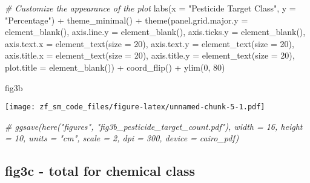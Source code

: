 \documentclass[
]{article}
\newenvironment{Shaded}{\begin{snugshade}}{\end{snugshade}}
\newcommand{\AttributeTok}[1]{\textcolor[rgb]{0.77,0.63,0.00}{#1}}
\newcommand{\CommentTok}[1]{\textcolor[rgb]{0.56,0.35,0.01}{\textit{#1}}}
\newcommand{\DecValTok}[1]{\textcolor[rgb]{0.00,0.00,0.81}{#1}}
\newcommand{\FunctionTok}[1]{\textcolor[rgb]{0.00,0.00,0.00}{#1}}
\newcommand{\NormalTok}[1]{#1}
\newcommand{\SpecialCharTok}[1]{\textcolor[rgb]{0.00,0.00,0.00}{#1}}
\newcommand{\StringTok}[1]{\textcolor[rgb]{0.31,0.60,0.02}{#1}}
\begin{document}
\begin{Shaded}
\begin{Highlighting}[]
  \CommentTok{\# Customize the appearance of the plot}
  \FunctionTok{labs}\NormalTok{(}\AttributeTok{x =} \StringTok{"Pesticide Target Class"}\NormalTok{, }\AttributeTok{y =} \StringTok{"Percentage"}\NormalTok{) }\SpecialCharTok{+}
  \FunctionTok{theme\_minimal}\NormalTok{() }\SpecialCharTok{+}
  \FunctionTok{theme}\NormalTok{(}\AttributeTok{panel.grid.major.y =} \FunctionTok{element\_blank}\NormalTok{(),}
    \AttributeTok{axis.line.y =} \FunctionTok{element\_blank}\NormalTok{(),}
    \AttributeTok{axis.ticks.y =} \FunctionTok{element\_blank}\NormalTok{(),}
    \AttributeTok{axis.text.x =} \FunctionTok{element\_text}\NormalTok{(}\AttributeTok{size =} \DecValTok{20}\NormalTok{),}
    \AttributeTok{axis.text.y =} \FunctionTok{element\_text}\NormalTok{(}\AttributeTok{size =} \DecValTok{20}\NormalTok{),}
    \AttributeTok{axis.title.x =} \FunctionTok{element\_text}\NormalTok{(}\AttributeTok{size =} \DecValTok{20}\NormalTok{),}
    \AttributeTok{axis.title.y =} \FunctionTok{element\_text}\NormalTok{(}\AttributeTok{size =} \DecValTok{20}\NormalTok{),}
    \AttributeTok{plot.title =} \FunctionTok{element\_blank}\NormalTok{()) }\SpecialCharTok{+}
    \FunctionTok{coord\_flip}\NormalTok{() }\SpecialCharTok{+}
    \FunctionTok{ylim}\NormalTok{(}\DecValTok{0}\NormalTok{, }\DecValTok{80}\NormalTok{)}


\NormalTok{ fig3b}
\end{Highlighting}
\end{Shaded}

\texttt{[image: zf\_sm\_code\_files/figure-latex/unnamed-chunk-5-1.pdf]}

\begin{Shaded}
\begin{Highlighting}[]
\CommentTok{\# ggsave(here("figures", "fig3b\_pesticide\_target\_count.pdf"), width = 16, height = 10, units = "cm", scale = 2, dpi = 300, device = cairo\_pdf)}
\end{Highlighting}
\end{Shaded}

\hypertarget{fig3c---total-for-chemical-class}{%
\subsection{fig3c - total for chemical
class}\label{fig3c---total-for-chemical-class}}
\end{document}
